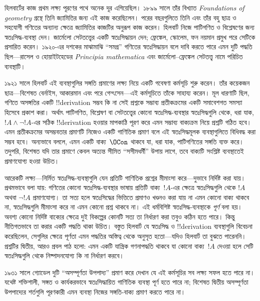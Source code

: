 \documentclass[../../../include/open-logic-section]{subfiles}
\begin{document}
হিলবার্টের কাজ প্রথম লক্ষ্য পূরণের পথে অনেক দূর এগিয়েছিল। ১৮৯৯ সালে তাঁর
বিখ্যাত \emph{Foundations of geometry} গ্রন্থে তিনি জ্যামিতির জন্য এই কাজ
করেছিলেন। পরের বছরগুলিতে তিনি এবং তাঁর বহু ছাত্র ও সহযোগী গণিতের অন্যান্য
ক্ষেত্রে জ্যামিতির কাজটির অনুরূপ কাজ করেন। হিলবার্ট নিজে পাটিগণিত ও বিশ্লেষণের
জন্য স্বতঃসিদ্ধ-ব্যবস্থা দেন। জার্মেলো সেটতত্ত্বের একটি স্বতঃসিদ্ধায়ন দেন;
ফ্রেঙ্কেল, স্কোলেম, ফন নয়মান প্রমুখ পরে সেটিকে প্রসারিত করেন। ১৯২০-এর দশকের
মাঝামাঝি ``সমগ্র'' গণিতের স্বতঃসিদ্ধায়ন বলে দাবি করতে পারে এমন দুটি পদ্ধতি
ছিল—রাসেল ও হোয়াইটহেডের \emph{Principia mathematica} এবং জার্মেলো--ফ্রেঙ্কেল
সেটতত্ত্ব নামে পরিচিত ব্যবস্থাটি।

১৯২১ সালে হিলবার্ট এই ব্যবস্থাগুলির সঙ্গতি প্রমাণের লক্ষ্য নিয়ে একটি গবেষণা
কর্মসূচি শুরু করেন। তাঁর কয়েকজন ছাত্র—বিশেষত বের্নাইস, আকারমান এবং পরে
গেন্ৎসেন—এই কর্মসূচিতে তাঁকে সাহায্য করেন। মূল ধারণাটি ছিল, গণিতে অসঙ্গতির
একটি !!{derivation} সম্ভব কি না সেই প্রশ্নকে সম্ভাব্য প্রতীকক্রমের একটি
সমাবেশগত সমস্যা হিসেবে প্রকাশ করা। অর্থাৎ পাটিগণিত, বিশ্লেষণ বা সেটতত্ত্বের
কোনো স্বতঃসিদ্ধ-ব্যবস্থার স্বতঃসিদ্ধগুলি থেকে, ধরা যাক, $!A \land
\lnot !A$-এর সঠিক !!{derivation} হওয়ার মাপকাঠি পূরণ করে এমন সম্ভাব্য
বাক্যক্রম নিয়ে প্রশ্নটি গঠিত হবে। এমন প্রতীকক্রমের অসম্ভবতার প্রমাণটি নিজেও
একটি গাণিতিক প্রমাণ বলে এই স্বতঃসিদ্ধমূলক ব্যবস্থাগুলিতে বিধিবদ্ধ করা সম্ভব
হবে। অন্যভাবে বললে, এমন একটি বাক্য~$\OCon$ থাকবে যা, ধরা যাক, পাটিগণিতের
সঙ্গতি ব্যক্ত করে। তদুপরি, বিশেষত যদি তার প্রমাণে কেবল অত্যন্ত সীমিত
``সসীমধর্মী'' উপায় লাগে, তবে বাক্যটি সংশ্লিষ্ট ব্যবস্থাতেই প্রমাণযোগ্য হওয়া
উচিত।

আরেকটি লক্ষ্য—নির্মিত স্বতঃসিদ্ধ-ব্যবস্থাগুলি যেন প্রতিটি গাণিতিক প্রশ্নের
মীমাংসা করে—দুভাবে নির্দিষ্ট করা যায়। প্রথমভাবে বলা যায়: গণিতের কোনো
স্বতঃসিদ্ধ-ব্যবস্থার ভাষায় প্রতিটি বাক্য~$!A$-এর ক্ষেত্রে স্বতঃসিদ্ধগুলি থেকে
$!A$ অথবা $\lnot !A$ প্রমাণযোগ্য। তা সত্য হলে স্বতঃসিদ্ধের ভিত্তিতে প্রমাণও
খণ্ডনও করা যায় না এমন কোনো বাক্য থাকবে না, স্বতঃসিদ্ধগুলি মীমাংসা করে না এমন
কোনো প্রশ্ন থাকবে না। এই ধর্মবিশিষ্ট স্বতঃসিদ্ধ-ব্যবস্থাকে
\emph{পূর্ণ} বলা হয়। অবশ্য কোনো নির্দিষ্ট বাক্যের ক্ষেত্রে দুই বিকল্পের কোনটি
সত্য তা নির্ধারণ করা তবুও কঠিন হতে পারে। কিন্তু নীতিগতভাবে তা করার একটি পদ্ধতি
থাকা উচিত। বস্তুত হিলবার্ট যে স্বতঃসিদ্ধ ও !!{derivation} ব্যবস্থাগুলি
বিবেচনা করেছিলেন, সেগুলির ক্ষেত্রে পূর্ণতা এমন পদ্ধতির অস্তিত্ব থেকে অনুসৃত
হতো—যদিও হিলবার্ট তা বুঝতে পারেননি। প্রশ্নটির দ্বিতীয়, আরও প্রবল পাঠ হলো:
এমন একটি যান্ত্রিক গণনাপদ্ধতি থাকবে যা কোনো বাক্য~$!A$ দেওয়া হলে সেটি
স্বতঃসিদ্ধগুলি থেকে নিষ্পাদনযোগ্য কি না নির্ধারণ করবে।

১৯৩১ সালে গ্যোডেল দুটি ``অসম্পূর্ণতা উপপাদ্য'' প্রমাণ করে দেখান যে এই
কর্মসূচির সব লক্ষ্য সফল হতে পারে না। যথেষ্ট শক্তিশালী, সঙ্গত ও কার্যকরভাবে
স্বতঃসিদ্ধায়িত গাণিতিক ব্যবস্থা পূর্ণ হতে পারে না; বিশেষত দ্বিতীয়
অসম্পূর্ণতা উপপাদ্যের শর্তগুলি পূরণকারী এমন ব্যবস্থা নিজের সঙ্গতি-বাক্য প্রমাণ
করতে পারে না।
\end{document}
